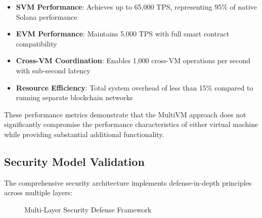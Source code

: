 \documentclass[11pt,a4paper]{article}
\begin{document}
\begin{itemize}
    \item \textbf{SVM Performance}: Achieves up to 65,000 TPS, representing 95\% of native Solana performance
    \item \textbf{EVM Performance}: Maintains 5,000 TPS with full smart contract compatibility
    \item \textbf{Cross-VM Coordination}: Enables 1,000 cross-VM operations per second with sub-second latency
    \item \textbf{Resource Efficiency}: Total system overhead of less than 15\% compared to running separate blockchain networks
\end{itemize}

These performance metrics demonstrate that the MultiVM approach does not significantly compromise the performance characteristics of either virtual machine while providing substantial additional functionality.

\subsection{Security Model Validation}

The comprehensive security architecture implements defense-in-depth principles across multiple layers:

\begin{figure}[H]
\centering
{}
\caption{Multi-Layer Security Defense Framework}
\label{fig:security-layers}
\end{figure}
\end{document}
